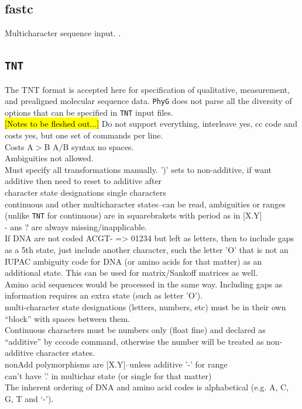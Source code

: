 \documentclass[11pt]{book}
\newcommand{\phyg}{\texttt{PhyG} }
\begin{document}
{{	\subsection{fastc}
		Multicharacter sequence input.  \citep{WheelerandWashburn2019}.
		
	\subsection{\texttt{TNT}}
		The TNT \citep{Goloboffetal2008} format is accepted here for specification of qualitative,
		measurement, and prealigned molecular sequence data. \phyg does not parse all the
		diversity of options that can be specified in \texttt{TNT} input files.\\
		
		\hl{[Notes to be fleshed out...]}
		Do not support everything, interleave yes, cc code and costs yes, but one set of commands per line.\\
		Costs A$>$B A$/$B syntax no spaces. \\
		Ambiguities not allowed.  \\
		Must specify all transformations manually.
		')' sets to non-additive, if want additive then need to reset to additive after\\
		character state designations single characters\\
		continuous and other multicharacter states--can be read, ambiguities or ranges (unlike \texttt{TNT} for continuous) are 
		in squarebrakets with period as in [X.Y]\\
		- ans ? are always missing/inapplicable.  \\
		If DNA are not coded ACGT- => 01234 but left as letters, then to include gaps as a 5th state, just 
		include another character, such the letter 'O' that is not an IUPAC 
		ambiguity code for DNA (or amino acids for that matter) as an additional state.  This can be used for 
		matrix/Sankoff matrices as well.\\
		Amino acid sequences would be processed in the same way.  Including gaps as information requires
		an extra state (such as letter 'O').\\ 
		multi-character state designations (letters, numbers, etc) must be in their own ``block'' with spaces 
		between them.\\
		Continuous characters must be numbers only (float fine) and declared as ``additive'' by cccode 
		command, otherwise the number will be treated as non-additive character states. \\
		nonAdd polymorphisms  are [X.Y]--unless  additive '-' for range\\
		can't have '.' in multichar state (or single for that matter)\\
		The inherent ordering of DNA and amino acid codes is alphabetical (e.g. A, C, G, T and `-').
	
}}
\end{document}
